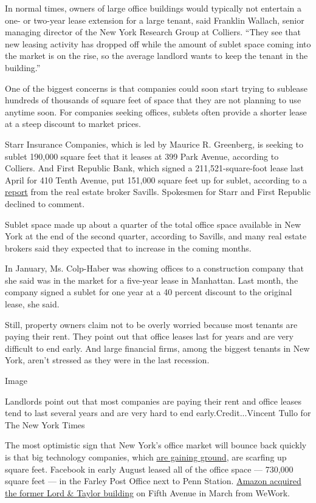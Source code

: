 In normal times, owners of large office buildings would typically not
entertain a one- or two-year lease extension for a large tenant, said
Franklin Wallach, senior managing director of the New York Research
Group at Colliers. ``They see that new leasing activity has dropped off
while the amount of sublet space coming into the market is on the rise,
so the average landlord wants to keep the tenant in the building.''

One of the biggest concerns is that companies could soon start trying to
sublease hundreds of thousands of square feet of space that they are not
planning to use anytime soon. For companies seeking offices, sublets
often provide a shorter lease at a steep discount to market prices.

Starr Insurance Companies, which is led by Maurice R. Greenberg, is
seeking to sublet 190,000 square feet that it leases at 399 Park Avenue,
according to Colliers. And First Republic Bank, which signed a
211,521-square-foot lease last April for 410 Tenth Avenue, put 151,000
square feet up for sublet, according to a
\href{https://pdf.euro.savills.co.uk/usa/market-reports/research-mim-ny-q2-2020-final.pdf}{report}
from the real estate broker Savills. Spokesmen for Starr and First
Republic declined to comment.

Sublet space made up about a quarter of the total office space available
in New York at the end of the second quarter, according to Savills, and
many real estate brokers said they expected that to increase in the
coming months.

In January, Ms. Colp-Haber was showing offices to a construction company
that she said was in the market for a five-year lease in Manhattan. Last
month, the company signed a sublet for one year at a 40 percent discount
to the original lease, she said.

Still, property owners claim not to be overly worried because most
tenants are paying their rent. They point out that office leases last
for years and are very difficult to end early. And large financial
firms, among the biggest tenants in New York, aren't stressed as they
were in the last recession.

Image

Landlords point out that most companies are paying their rent and office
leases tend to last several years and are very hard to end
early.Credit...Vincent Tullo for The New York Times

The most optimistic sign that New York's office market will bounce back
quickly is that big technology companies, which
\href{https://www.nytimes3xbfgragh.onion/2020/08/19/technology/big-tech-business-domination.html}{are
gaining ground}, are scarfing up square feet. Facebook in early August
leased all of the office space --- 730,000 square feet --- in the Farley
Post Office next to Penn Station.
\href{https://www.nytimes3xbfgragh.onion/2020/08/18/technology/amazon-office-expansion.html}{Amazon
acquired the former Lord \& Taylor building} on Fifth Avenue in March
from WeWork.

